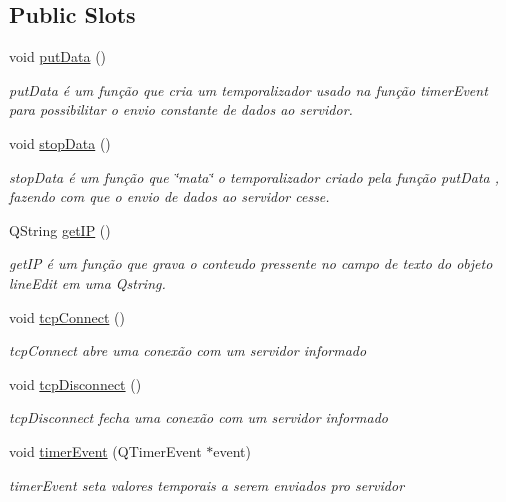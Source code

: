 \subsection*{Public Slots}
\begin{DoxyCompactItemize}
\item 
void \hyperlink{class_main_window_afdfeb13ec363b0eb8ecacaf0aa13b605}{put\+Data} ()
\begin{DoxyCompactList}\small\item\em put\+Data é um função que cria um temporalizador usado na função timer\+Event para possibilitar o envio constante de dados ao servidor. \end{DoxyCompactList}\item 
void \hyperlink{class_main_window_a79fdaf1fd769f0584f50da34e415b3de}{stop\+Data} ()
\begin{DoxyCompactList}\small\item\em stop\+Data é um função que \char`\"{}mata\char`\"{} o temporalizador criado pela função put\+Data , fazendo com que o envio de dados ao servidor cesse. \end{DoxyCompactList}\item 
Q\+String \hyperlink{class_main_window_a2bf0fb2c40fb08b96f95f65d9ee1c979}{get\+IP} ()
\begin{DoxyCompactList}\small\item\em get\+IP é um função que grava o conteudo pressente no campo de texto do objeto line\+Edit em uma Qstring. \end{DoxyCompactList}\item 
void \hyperlink{class_main_window_ac5b669957c442b6eb68573dacfce33e1}{tcp\+Connect} ()
\begin{DoxyCompactList}\small\item\em tcp\+Connect abre uma conexão com um servidor informado \end{DoxyCompactList}\item 
void \hyperlink{class_main_window_a4d22c4c7afc7ba0a2fa4c70515c85dda}{tcp\+Disconnect} ()
\begin{DoxyCompactList}\small\item\em tcp\+Disconnect fecha uma conexão com um servidor informado \end{DoxyCompactList}\item 
void \hyperlink{class_main_window_aaa425b1554af3c1f58cc70b4815082ae}{timer\+Event} (Q\+Timer\+Event $\ast$event)
\begin{DoxyCompactList}\small\item\em timer\+Event seta valores temporais a serem enviados pro servidor \end{DoxyCompactList}\end{DoxyCompactItemize}
